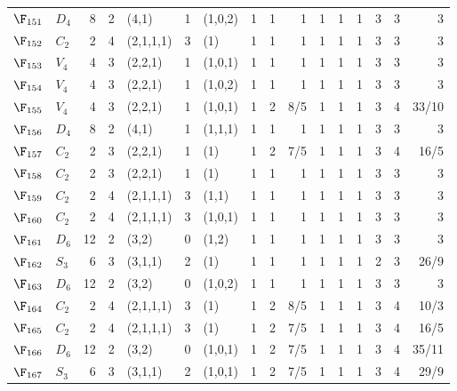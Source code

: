\begin{landscape}
{\begin{longtable}{@{}l l r r l r l rrr rrr rrr@{}}
\textbf{$\F_{151}$} & $D_{4}$ & 8 & 2 & (4,1) & 1 & (1,0,2) & 1 & 1 & 1 & 1 & 1 & 1 & 3 & 3 & 3 \\
\addlinespace[3pt]
\textbf{$\F_{152}$} & $C_{2}$ & 2 & 4 & (2,1,1,1) & 3 & (1) & 1 & 1 & 1 & 1 & 1 & 1 & 3 & 3 & 3 \\
\addlinespace[3pt]
\textbf{$\F_{153}$} & $V_{4}$ & 4 & 3 & (2,2,1) & 1 & (1,0,1) & 1 & 1 & 1 & 1 & 1 & 1 & 3 & 3 & 3 \\
\addlinespace[3pt]
\textbf{$\F_{154}$} & $V_{4}$ & 4 & 3 & (2,2,1) & 1 & (1,0,2) & 1 & 1 & 1 & 1 & 1 & 1 & 3 & 3 & 3 \\
\addlinespace[3pt]
\textbf{$\F_{155}$} & $V_{4}$ & 4 & 3 & (2,2,1) & 1 & (1,0,1) & 1 & 2 & 8/5 & 1 & 1 & 1 & 3 & 4 & 33/10 \\
\addlinespace[3pt]
\textbf{$\F_{156}$} & $D_{4}$ & 8 & 2 & (4,1) & 1 & (1,1,1) & 1 & 1 & 1 & 1 & 1 & 1 & 3 & 3 & 3 \\
\addlinespace[3pt]
\textbf{$\F_{157}$} & $C_{2}$ & 2 & 3 & (2,2,1) & 1 & (1) & 1 & 2 & 7/5 & 1 & 1 & 1 & 3 & 4 & 16/5 \\
\addlinespace[3pt]
\textbf{$\F_{158}$} & $C_{2}$ & 2 & 3 & (2,2,1) & 1 & (1) & 1 & 1 & 1 & 1 & 1 & 1 & 3 & 3 & 3 \\
\addlinespace[3pt]
\textbf{$\F_{159}$} & $C_{2}$ & 2 & 4 & (2,1,1,1) & 3 & (1,1) & 1 & 1 & 1 & 1 & 1 & 1 & 3 & 3 & 3 \\
\addlinespace[3pt]
\textbf{$\F_{160}$} & $C_{2}$ & 2 & 4 & (2,1,1,1) & 3 & (1,0,1) & 1 & 1 & 1 & 1 & 1 & 1 & 3 & 3 & 3 \\
\addlinespace[3pt]
\textbf{$\F_{161}$} & $D_{6}$ & 12 & 2 & (3,2) & 0 & (1,2) & 1 & 1 & 1 & 1 & 1 & 1 & 3 & 3 & 3 \\
\addlinespace[3pt]
\textbf{$\F_{162}$} & $S_{3}$ & 6 & 3 & (3,1,1) & 2 & (1) & 1 & 1 & 1 & 1 & 1 & 1 & 2 & 3 & 26/9 \\
\addlinespace[3pt]
\textbf{$\F_{163}$} & $D_{6}$ & 12 & 2 & (3,2) & 0 & (1,0,2) & 1 & 1 & 1 & 1 & 1 & 1 & 3 & 3 & 3 \\
\addlinespace[3pt]
\textbf{$\F_{164}$} & $C_{2}$ & 2 & 4 & (2,1,1,1) & 3 & (1) & 1 & 2 & 8/5 & 1 & 1 & 1 & 3 & 4 & 10/3 \\
\addlinespace[3pt]
\textbf{$\F_{165}$} & $C_{2}$ & 2 & 4 & (2,1,1,1) & 3 & (1) & 1 & 2 & 7/5 & 1 & 1 & 1 & 3 & 4 & 16/5 \\
\addlinespace[3pt]
\textbf{$\F_{166}$} & $D_{6}$ & 12 & 2 & (3,2) & 0 & (1,0,1) & 1 & 2 & 7/5 & 1 & 1 & 1 & 3 & 4 & 35/11 \\
\addlinespace[3pt]
\textbf{$\F_{167}$} & $S_{3}$ & 6 & 3 & (3,1,1) & 2 & (1,0,1) & 1 & 2 & 7/5 & 1 & 1 & 1 & 3 & 4 & 29/9 \\

\end{longtable}}
\end{landscape}
